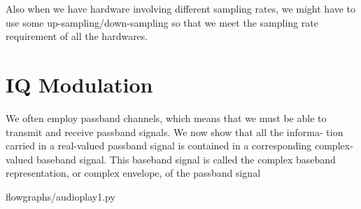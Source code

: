 \documentclass[a4paper,10pt]{article}
\begin{document}
Also when we have hardware involving different sampling rates, we might have to use some up-sampling/down-sampling
so that we meet the sampling rate requirement of all the hardwares.

\section{IQ Modulation\cite{bib:madhov}}
We often employ passband channels, which means that we must be able to
transmit and receive passband signals. We now show that all the informa-
tion carried in a real-valued passband signal is contained in a corresponding
complex-valued baseband signal. This baseband signal is called the complex
baseband representation, or complex envelope, of the passband signal




\begin{appendices}

{flowgraphs/audioplay1.py}
\end{appendices}
\end{document}
